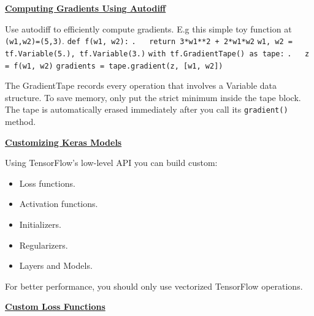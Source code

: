 \textbf{\underline{Computing Gradients Using Autodiff}}

Use autodiff to efficiently compute gradients. E.g this simple toy function at \texttt{(w1,w2)=(5,3)}.\newline
\texttt{def f(w1, w2):}\newline
\texttt{.~~~return 3*w1**2 + 2*w1*w2}\newline
\texttt{}\newline
\texttt{w1, w2 = tf.Variable(5.), tf.Variable(3.)}\newline
\texttt{with tf.GradientTape() as tape:}\newline
\texttt{.~~~z = f(w1, w2)}\newline
\texttt{gradients = tape.gradient(z, [w1, w2])}

The GradientTape records every operation that involves a Variable data structure.\newline
To save memory, only put the strict minimum inside the tape block.\newline
The tape is automatically erased immediately after you call its \texttt{gradient()} method.\newline

\textbf{\underline{Customizing Keras Models}}

Using TensorFlow's low-level API you can build custom:
% 
\vspace{-5.0mm}
\begin{itemize}
\item
Loss functions.
\vspace{-3.0mm}
\item
Activation functions.
\vspace{-3.0mm}
\item
Initializers.
\vspace{-3.0mm}
\item
Regularizers.
\vspace{-3.0mm}
\item
Layers and Models.
\end{itemize}

\newpage
For better performance,
you should only use vectorized TensorFlow operations.\newline

\textbf{\underline{Custom Loss Functions}}

